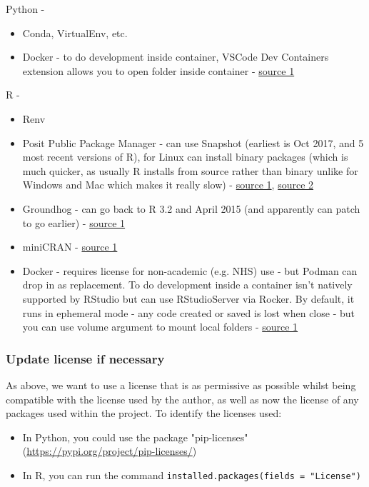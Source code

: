 Python -
\begin{itemize}
    \item Conda, VirtualEnv, etc.
    \item Docker - to do development inside container, VSCode Dev Containers extension allows you to open folder inside container - \href{https://code.visualstudio.com/docs/devcontainers/containers}{source 1}
\end{itemize}

R -
\begin{itemize}
    \item Renv
    \item Posit Public Package Manager - can use Snapshot (earliest is Oct 2017, and 5 most recent versions of R), for Linux can install binary packages (which is much quicker, as usually R installs from source rather than binary unlike for Windows and Mac which makes it really slow) - \href{https://packagemanager.posit.co/client/#/repos/cran/setup}{source 1}, \href{https://docs.posit.co/faq/p3m-faq/#frequently-asked-questions}{source 2}
    \item Groundhog - can go back to R 3.2 and April 2015 (and apparently can patch to go earlier) - \href{https://www.brodrigues.co/blog/2023-01-12-repro_r/}{source 1}
    \item miniCRAN - \href{https://learn.microsoft.com/en-us/sql/machine-learning/package-management/create-a-local-package-repository-using-minicran?view=sql-server-ver16}{source 1}
    \item Docker - requires license for non-academic (e.g. NHS) use - but Podman can drop in as replacement. To do development inside a container isn't natively supported by RStudio but can use RStudioServer via Rocker. By default, it runs in ephemeral mode - any code created or saved is lost when close - but you can use volume argument to mount local folders - \href{https://towardsdatascience.com/running-rstudio-inside-a-container-e9db5e809ff8}{source 1}
\end{itemize}

\subsubsection{Update license if necessary}

As above, we want to use a license that is as permissive as possible whilst being compatible with the license used by the author, as well as now the license of any packages used within the project. To identify the licenses used:
\begin{itemize}
    \item In Python, you could use the package "pip-licenses" (\url{https://pypi.org/project/pip-licenses/})
    \item In R, you can run the command \texttt{installed.packages(fields = "License")}
\end{itemize}

